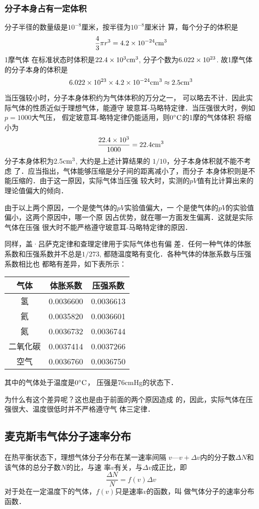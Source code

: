 \subsubsection{分子本身占有一定体积}

分子半径的数量级是$10^{-8}$厘米，按半径为$10^{-8}$厘米计
算，每个分子的体积是
\[\frac{4}{3}\pi r^3=4.2\times 10^{-24}{\rm cm^3}\]
1摩气体
在标准状态时体积是$22.4\times10^3{\rm cm^3}$, 分子个数为$6.022
\times10^{23}$. 故1摩气体的分子本身的体积是$$6.022\times10^{23}\times4.2
\times10^{-24}{\rm cm^3}\approx 2.5{\rm cm^3}$$

当压强较小时，分子本身体积约为气体体积的万分之一，
可以略去不计．因此实际气体的性质近似于理想气体，能遵守
玻意耳-马略特定律．当压强很大时，例如$p=1000$大气压，
假定玻意耳-略特定律仍能适用，则$0^{\circ}{\rm C}$的1摩的气体体积
将缩小为
\[\frac{22.4\times 10^3}{1000}=22.4{\rm cm^3}\]
分子本身体积为2.5${\rm cm^3}$, 大约是上述计算结果的
$1/10$，分子本身体积就不能不考虑
了．应当指出，气体能够压缩是分子间的距离减小了，而分子
本身体积则是不能压缩的．由于这一原因，实际气体当压强
较大时，实测的$pV$值有比计算出来的理论值偏大的倾向．

由于以上两个原因，一个是使气体的$pV$实验值偏大，一
个是使气体的$pV$的实验值偏小，这两个原因中，哪一个原
因占优势，就在哪一方面发生偏离．这就是实际气体在压强
很大时不能严格遵守玻意耳-马略特定律的原因．

同样，盖·吕萨克定律和查理定律用于实际气体也有偏
差．任何一种气体的体胀系数和压强系数并不总是$1/273$,
都随温度略有变化．各种气体的体胀系数与压强系数相比也
都略有差异，如下表所示：
\begin{center}
    \begin{tabular}{ccc}
\hline
气体  & 体胀系数&压强系数\\
\hline
氢&0.0036600&0.0036613\\
氦&0.0035820&0.0036601\\
氮&0.0036732&0.0036744\\
二氧化碳&0.0037414&0.0037266\\
空气&0.0036760&0.0036750\\
\hline
    \end{tabular}
\end{center}
其中的气体处于温度是$0^{\circ}{\rm C}$，
压强是76cmHg的状态下．


为什么有这个差异呢？这也是由于前面的两个原因造成
的，因此，实际气体在压强很大、温度很低时并不严格遵守气
体三定律．

\subsection{麦克斯韦气体分子速率分布}
在热平衡状态下，理想气体分子分布在某一速率间隔
$v$—$v+\Delta v$内的分子数$\Delta N$和该气体的总分子数$N$的比，与速
率$v$有关，与$\Delta v$成正比，即
\[\frac{\Delta N}{N}=f(v)\Delta v\]
对于处在一定温度下的气体，$f(v)$只是速率$v$的函数，叫
做气体分子的速率分布函数．

